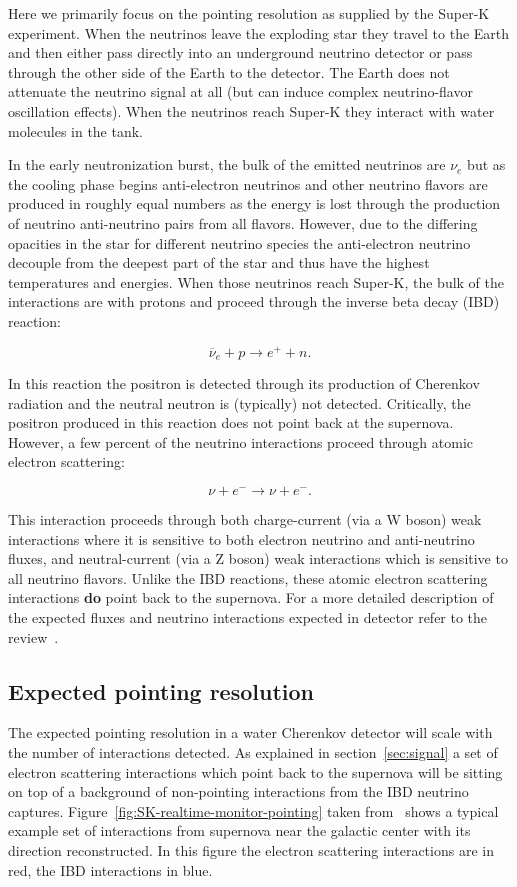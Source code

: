 \documentclass[11pt]{article}
\newcommand{\superk}  {Super\nobreakdash-K\xspace}
\begin{document}
Here we primarily focus on the pointing resolution as supplied by the
\superk experiment.  When the neutrinos leave the exploding star they
travel to the Earth and then either pass directly into an underground
neutrino detector or pass through the other side of the Earth to the
detector. The Earth does not attenuate the neutrino signal at all (but
can induce complex neutrino-flavor oscillation effects).  When the
neutrinos reach \superk they interact with water molecules in the
tank.

In the early neutronization burst, the bulk of the emitted neutrinos
are $\nu_e$ but as the cooling phase begins anti-electron neutrinos
and other neutrino flavors are produced in roughly equal numbers as
the energy is lost through the production of neutrino anti-neutrino
pairs from all flavors.  However, due to the differing opacities in
the star for different neutrino species the anti-electron neutrino
decouple from the deepest part of the star and thus have the highest
temperatures and energies.  When those neutrinos reach \superk, the
bulk of the interactions are with protons and proceed through the
inverse beta decay (IBD) reaction:

$$ \overline{\nu}_{e}+ p \rightarrow e^{+} + n. $$

In this reaction the positron is detected through its production of
Cherenkov radiation and the neutral neutron is (typically) not
detected.  Critically, the positron produced in this reaction does not
point back at the supernova.   However, a few percent of the neutrino interactions proceed
through atomic electron scattering:

$$ \nu + e^{-} \rightarrow \nu + e^{-} .$$

This interaction proceeds through both charge-current (via a W boson)
weak interactions where it is sensitive to both electron neutrino and
anti-neutrino fluxes, and neutral-current (via a Z boson) weak
interactions which is sensitive to all neutrino flavors. Unlike the
IBD reactions, these atomic electron scattering interactions {\bf do} point
back to the supernova.  For a more detailed description of the
expected fluxes and neutrino interactions expected in detector refer
to the review~\cite{2012ARNPS..62...81S}.

\subsection{Expected pointing resolution}

The expected pointing resolution in a water Cherenkov detector will
scale with the number of interactions detected.  As explained in
section~\ref{sec:signal} a set of electron scattering interactions which
point back to the supernova will be sitting on top of a background of
non-pointing interactions from the IBD neutrino captures.
Figure~\ref{fig:SK-realtime-monitor-pointing} taken
from~\cite{2016APh....81...39A} shows a typical example set of
interactions from supernova near the galactic center with its
direction reconstructed.  In this figure the electron scattering
interactions are in red, the IBD interactions in blue.
\end{document}
